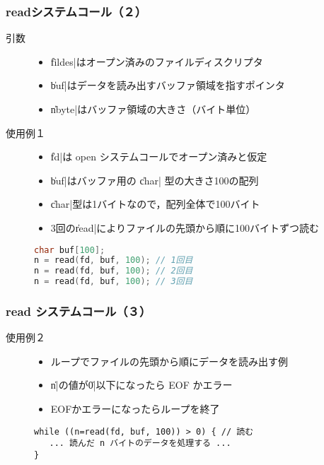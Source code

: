 \documentclass{beamer}                 %
\begin{document}
\begin{frame}[fragile]
  \frametitle{readシステムコール（２）}
\begin{description}
\item[引数]
\begin{itemize}
\item \|fildes|はオープン済みのファイルディスクリプタ
\item \|buf|はデータを読み出すバッファ領域を指すポインタ
\item \|nbyte|はバッファ領域の大きさ（バイト単位）
\end{itemize}

\item[使用例１]
\begin{itemize}
\item \|fd|は open システムコールでオープン済みと仮定
\item \|buf|はバッファ用の \|char| 型の大きさ100の配列
\item \|char|型は1バイトなので，配列全体で100バイト
\item 3回の\|read|によりファイルの先頭から順に100バイトずつ読む
\end{itemize}

\begin{lstlisting}[language=C++]
char buf[100];
n = read(fd, buf, 100); // 1回目
n = read(fd, buf, 100); // 2回目
n = read(fd, buf, 100); // 3回目
\end{lstlisting}

\end{description}
\end{frame}

\begin{frame}[fragile]
  \frametitle{read システムコール（３）}
\begin{description}
\item[使用例２]
\begin{itemize}
\item ループでファイルの先頭から順にデータを読み出す例
\item \|n|の値が\|0|以下になったら EOF かエラー
\item EOFかエラーになったらループを終了
\end{itemize}

\begin{lstlisting}[numbers=none]
while ((n=read(fd, buf, 100)) > 0) { // 読む
   ... 読んだ n バイトのデータを処理する ...
}
\end{lstlisting}
\end{description}
\end{frame}
\end{document}
